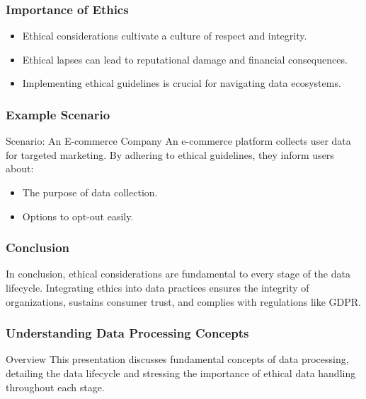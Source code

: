 \documentclass[aspectratio=169]{beamer}
\begin{document}
\begin{frame}[fragile]
    \frametitle{Importance of Ethics}
    \begin{itemize}
        \item Ethical considerations cultivate a culture of respect and integrity.
        \item Ethical lapses can lead to reputational damage and financial consequences.
        \item Implementing ethical guidelines is crucial for navigating data ecosystems.
    \end{itemize}
\end{frame}

\begin{frame}[fragile]
    \frametitle{Example Scenario}
    \begin{block}{Scenario: An E-commerce Company}
        An e-commerce platform collects user data for targeted marketing. By adhering to ethical guidelines, they inform users about:
        \begin{itemize}
            \item The purpose of data collection.
            \item Options to opt-out easily.
        \end{itemize}
    \end{block}
\end{frame}

\begin{frame}[fragile]
    \frametitle{Conclusion}
    In conclusion, ethical considerations are fundamental to every stage of the data lifecycle. Integrating ethics into data practices ensures the integrity of organizations, sustains consumer trust, and complies with regulations like GDPR.
\end{frame}

\begin{frame}[fragile]
    \frametitle{Understanding Data Processing Concepts}
    \begin{block}{Overview}
        This presentation discusses fundamental concepts of data processing, detailing the data lifecycle and stressing the importance of ethical data handling throughout each stage.
    \end{block}
\end{frame}
\end{document}
